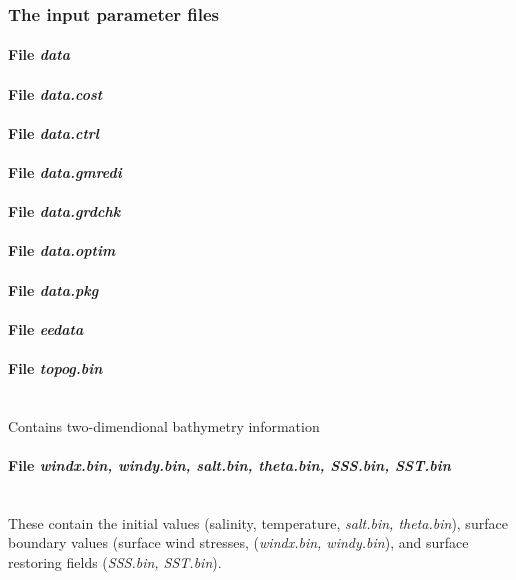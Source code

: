 \subsubsection{The input parameter files}
\label{www:tutorials}

\paragraph{File {\it data}}

\paragraph{File {\it data.cost}}

\paragraph{File {\it data.ctrl}}

\paragraph{File {\it data.gmredi}}

\paragraph{File {\it data.grdchk}}

\paragraph{File {\it data.optim}}

\paragraph{File {\it data.pkg}}

\paragraph{File {\it eedata}}

\paragraph{File {\it topog.bin}} ~ \\
%
Contains two-dimendional bathymetry information

\paragraph{File {\it windx.bin, windy.bin, salt.bin, theta.bin, 
SSS.bin, SST.bin}} ~ \\
%
These contain the initial values
(salinity, temperature, {\it salt.bin, theta.bin}), 
surface boundary values (surface wind stresses,
({\it windx.bin, windy.bin}), and surface restoring fields
({\it SSS.bin, SST.bin}).

